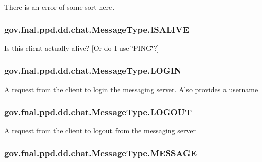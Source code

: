There is an error of some sort here. \hypertarget{enumgov_1_1fnal_1_1ppd_1_1dd_1_1chat_1_1MessageType_a2ed9c72efc8c9e99324aea4b5ee48b22}{
\subsubsection[{I\-S\-A\-L\-I\-V\-E}]{\setlength{\rightskip}{0pt plus 5cm}gov.\-fnal.\-ppd.\-dd.\-chat.\-Message\-Type.\-I\-S\-A\-L\-I\-V\-E}}\label{enumgov_1_1fnal_1_1ppd_1_1dd_1_1chat_1_1MessageType_a2ed9c72efc8c9e99324aea4b5ee48b22}
Is this client actually alive? \mbox{[}Or do I use \char`\"{}\-P\-I\-N\-G\char`\"{}?\mbox{]} \hypertarget{enumgov_1_1fnal_1_1ppd_1_1dd_1_1chat_1_1MessageType_a8d27be5a9d764efc7aaa4d655bb7a30a}{
\subsubsection[{L\-O\-G\-I\-N}]{\setlength{\rightskip}{0pt plus 5cm}gov.\-fnal.\-ppd.\-dd.\-chat.\-Message\-Type.\-L\-O\-G\-I\-N}}\label{enumgov_1_1fnal_1_1ppd_1_1dd_1_1chat_1_1MessageType_a8d27be5a9d764efc7aaa4d655bb7a30a}
A request from the client to login the messaging server. Also provides a username \hypertarget{enumgov_1_1fnal_1_1ppd_1_1dd_1_1chat_1_1MessageType_aba9c716304ccdd40f9c477bd551c6176}{
\subsubsection[{L\-O\-G\-O\-U\-T}]{\setlength{\rightskip}{0pt plus 5cm}gov.\-fnal.\-ppd.\-dd.\-chat.\-Message\-Type.\-L\-O\-G\-O\-U\-T}}\label{enumgov_1_1fnal_1_1ppd_1_1dd_1_1chat_1_1MessageType_aba9c716304ccdd40f9c477bd551c6176}
A request from the client to logout from the messaging server \hypertarget{enumgov_1_1fnal_1_1ppd_1_1dd_1_1chat_1_1MessageType_a959fbbd3acc7337c34fefdab32951384}{
\subsubsection[{M\-E\-S\-S\-A\-G\-E}]{\setlength{\rightskip}{0pt plus 5cm}gov.\-fnal.\-ppd.\-dd.\-chat.\-Message\-Type.\-M\-E\-S\-S\-A\-G\-E}}\label{enumgov_1_1fnal_1_1ppd_1_1dd_1_1chat_1_1MessageType_a959fbbd3acc7337c34fefdab32951384}
